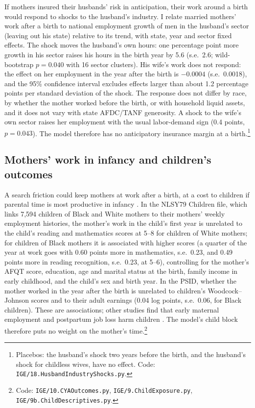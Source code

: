 If mothers insured their husbands' risk in anticipation, their work around a birth would respond to shocks to the
husband's industry. I relate married mothers' work after a birth to national employment growth of men in the husband's
sector (leaving out his state) relative to its trend, with state, year and sector fixed effects. The shock moves the
husband's own hours: one percentage point more growth in his sector raises his hours in the birth year by 5.6 (s.e.\
2.6; wild-bootstrap $p=0.040$ with 16 sector clusters). His wife's work does not respond: the effect on her employment in
the year after the birth is $-0.0004$ (s.e.\ 0.0018), and the 95\% confidence interval excludes effects larger than about
1.2 percentage points per standard deviation of the shock. The response does not differ by race, by whether the mother
worked before the birth, or with household liquid assets, and it does not vary with state AFDC/TANF generosity. A shock
to the wife's own sector raises her employment with the usual labor-demand sign (0.4 points, $p=0.043$). The model
therefore has no anticipatory insurance margin at a birth.\footnote{Placebos: the husband's shock two years before the
birth, and the husband's shock for childless wives, have no effect. Code: \texttt{IGE/18.HusbandIndustryShocks.py}.}

\subsection{Mothers' work in infancy and children's outcomes}\label{sec:time}

A search friction could keep mothers at work after a birth, at a cost to children if parental time is most productive
in infancy \citep{delboca2014household}. In the NLSY79 Children file, which links 7,594 children of Black and White
mothers to their mothers' weekly employment histories, the mother's work in the child's first year is unrelated to the
child's reading and mathematics scores at 5--8 for children of White mothers; for children of Black mothers it is
associated with higher scores (a quarter of the year at work goes with 0.60 points more in mathematics, s.e.\ 0.23, and
0.49 points more in reading recognition, s.e.\ 0.23, at 5--6), controlling for the mother's AFQT score, education, age
and marital status at the birth, family income in early childhood, and the child's sex and birth year. In the PSID,
whether the mother worked in the year after the birth is unrelated to children's Woodcock--Johnson scores and to their
adult earnings (0.04 log points, s.e.\ 0.06, for Black children). These are associations; other studies find that early
maternal employment and postpartum job loss harm children \citep{herbst2017are, willage2022postpartum}. The model's
child block therefore puts no weight on the mother's time.\footnote{Code: \texttt{IGE/10.CYAOutcomes.py},
\texttt{IGE/9.ChildExposure.py}, \texttt{IGE/9b.ChildDescriptives.py}.}

